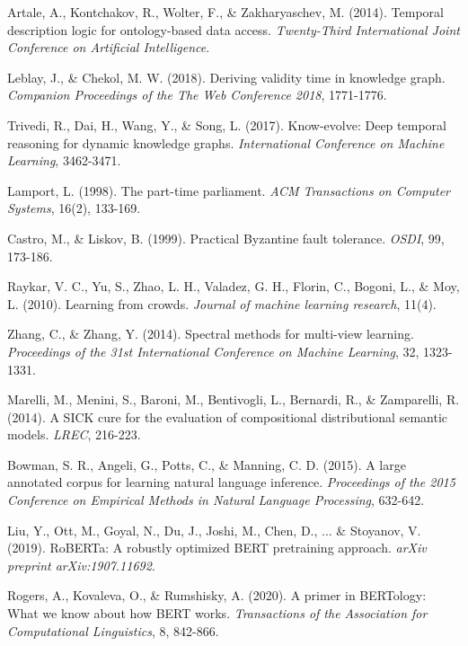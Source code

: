 \documentclass[12pt,a4paper]{article}
\begin{document}
\begin{thebibliography}{50}
Artale, A., Kontchakov, R., Wolter, F., \& Zakharyaschev, M. (2014).
Temporal description logic for ontology-based data access.
\textit{Twenty-Third International Joint Conference on Artificial Intelligence}.

Leblay, J., \& Chekol, M. W. (2018).
Deriving validity time in knowledge graph.
\textit{Companion Proceedings of the The Web Conference 2018}, 1771-1776.

Trivedi, R., Dai, H., Wang, Y., \& Song, L. (2017).
Know-evolve: Deep temporal reasoning for dynamic knowledge graphs.
\textit{International Conference on Machine Learning}, 3462-3471.

Lamport, L. (1998).
The part-time parliament.
\textit{ACM Transactions on Computer Systems}, 16(2), 133-169.

Castro, M., \& Liskov, B. (1999).
Practical Byzantine fault tolerance.
\textit{OSDI}, 99, 173-186.

Raykar, V. C., Yu, S., Zhao, L. H., Valadez, G. H., Florin, C., Bogoni, L., \& Moy, L. (2010).
Learning from crowds.
\textit{Journal of machine learning research}, 11(4).

Zhang, C., \& Zhang, Y. (2014).
Spectral methods for multi-view learning.
\textit{Proceedings of the 31st International Conference on Machine Learning}, 32, 1323-1331.

Marelli, M., Menini, S., Baroni, M., Bentivogli, L., Bernardi, R., \& Zamparelli, R. (2014).
A SICK cure for the evaluation of compositional distributional semantic models.
\textit{LREC}, 216-223.

Bowman, S. R., Angeli, G., Potts, C., \& Manning, C. D. (2015).
A large annotated corpus for learning natural language inference.
\textit{Proceedings of the 2015 Conference on Empirical Methods in Natural Language Processing}, 632-642.

Liu, Y., Ott, M., Goyal, N., Du, J., Joshi, M., Chen, D., ... \& Stoyanov, V. (2019).
RoBERTa: A robustly optimized BERT pretraining approach.
\textit{arXiv preprint arXiv:1907.11692}.

Rogers, A., Kovaleva, O., \& Rumshisky, A. (2020).
A primer in BERTology: What we know about how BERT works.
\textit{Transactions of the Association for Computational Linguistics}, 8, 842-866.


\end{thebibliography}
\end{document}
